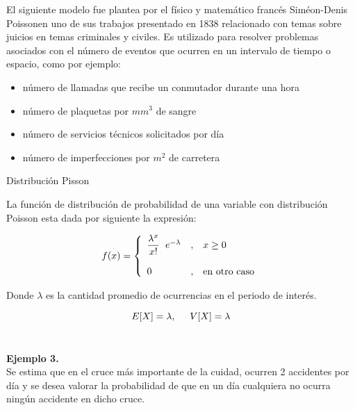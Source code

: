 \documentclass[base=hide,12pt]{elegantbook}
\begin{document}
El siguiente modelo fue plantea por el físico y matemático francés Siméon-Denis Poissonen uno de sus trabajos presentado en 1838 relacionado con temas sobre juicios en temas criminales y civiles. Es  utilizado para resolver problemas asociados con el número de eventos que ocurren en un intervalo de tiempo o espacio, como por ejemplo: 
\begin{itemize}
	\item número de llamadas que recibe un conmutador durante una hora
	\item número de plaquetas por $mm^{3}$ de sangre
	\item número de servicios técnicos solicitados por día
	\item número de imperfecciones por $m^{2}$  de carretera
\end{itemize}
\vspace{.3cm}
\begin{Box2}{Distribución Pisson}
	
	\noindent La función de distribución de probabilidad de una variable con distribución Poisson esta dada por siguiente la expresión:
	
	\begin{equation*}
		f(x)=\left\lbrace
		\begin{array}{lll}
			\dfrac{\lambda^{x}}{x!} \hspace{.2cm} e^{-\lambda} &,& x \geq 0   \\
			&&\\
			0 &,& \mbox{en otro caso}
		\end{array}
		\right.
	\end{equation*}
	
	\noindent Donde $\lambda$ es la cantidad promedio de ocurrencias en el periodo de interés.
	
	$$E[X]=\lambda, \hspace{.5cm} V[X]=\lambda $$
	\\
	
\end{Box2}
\vspace{.5cm} 
\textcolor{col3}{\bf \large Ejemplo 3.} \\ 
Se estima que en el cruce más importante de la cuidad, ocurren 2 accidentes por día y se desea valorar la probabilidad de que en un día cualquiera no ocurra ningún accidente en dicho cruce.\\
\end{document}
